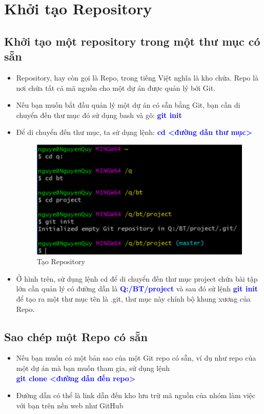 \documentclass[12pt,a4paper]{report}
\begin{document}
\section{Khởi tạo Repository}

\subsection{Khởi tạo một repository trong một thư mục có sẵn}
\begin{itemize}
\item Repository, hay còn gọi là Repo, trong tiếng Việt nghĩa là kho chứa. Repo là nơi chứa tất cả mã nguồn cho một dự án được quản lý bởi Git.
\item Nếu bạn muốn bắt đầu quản lý một dự án có sẵn bằng Git, bạn cần di chuyển đến thư mục đó sử dụng bash và gõ: \textcolor{blue}{\bf git init}
\item Để di chuyển đến thư mục, ta sử dụng lệnh: \textcolor{blue}{\bf cd <đường dẫn thư mục> }

\begin{figure}[!ht]
	\centering
	\includegraphics[width=0.8\linewidth]{screenshot005}
\caption{Tạo Repository}
	\label{fig:screenshot005}
\end{figure}

\item Ở hình trên, sử dụng lệnh cd để di chuyển đến thư mục project chứa bài tập lớn cần quản lý có đường dẫn là \textcolor{blue}{\bf Q:/BT/project} và sau đó sử lệnh \textcolor{blue}{\bf git init} để tạo ra một thư mục tên là .git, thư mục này chính bộ khung xương của Repo.
\end{itemize}
\subsection{Sao chép một Repo có sẵn}
\begin{itemize}
\item Nếu bạn muốn có một bản sao của một Git repo có sẵn, ví dụ như repo của một dự án mà bạn muốn tham gia, sử dụng lệnh\\ \textcolor{blue}{\bf git clone <đường dẫn đến repo>}
\item Đường dẫn có thể là link dẫn đến kho lưu trữ mã nguồn của nhóm làm việc với bạn trên nền web như GitHub
\end{itemize}
\end{document}
